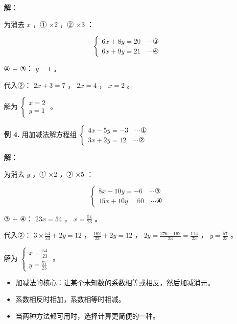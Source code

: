 \begin{workedexamples}
\textbf{解：}

为消去 $x$ ，① $\times 2$ ，② $\times 3$ ：

\[
\begin{cases} 6x + 8y = 20 \quad \cdots ③ \\ 6x + 9y = 21 \quad \cdots ④ \end{cases}
\]


④ $-$ ③： $y = 1$ 。

代入②： $2x + 3 = 7$ ， $2x = 4$ ， $x = 2$ 。

解为 $\begin{cases} x = 2 \\ y = 1 \end{cases}$ 。

\textbf{例 4.} 用加减法解方程组 $\begin{cases} 4x - 5y = -3 \quad \cdots ① \\ 3x + 2y = 12 \quad \cdots ② \end{cases}$

\textbf{解：}

为消去 $y$ ，① $\times 2$ ，② $\times 5$ ：

\[
\begin{cases} 8x - 10y = -6 \quad \cdots ③ \\ 15x + 10y = 60 \quad \cdots ④ \end{cases}
\]


③ $+$ ④： $23x = 54$ ， $x = \frac{54}{23}$ 。

代入②： $3 \times \frac{54}{23} + 2y = 12$ ， $\frac{162}{23} + 2y = 12$ ， $2y = \frac{276 - 162}{23} = \frac{114}{23}$ ， $y = \frac{57}{23}$ 。

解为 $\begin{cases} x = \frac{54}{23} \\ y = \frac{57}{23} \end{cases}$ 。

\end{workedexamples}

\begin{keytakeaway}


\begin{itemize}
  \item 加减法的核心：让某个未知数的系数相等或相反，然后加减消元。
  \item 系数相反时相加，系数相等时相减。
  \item 当两种方法都可用时，选择计算更简便的一种。
\end{itemize}


\end{keytakeaway}

